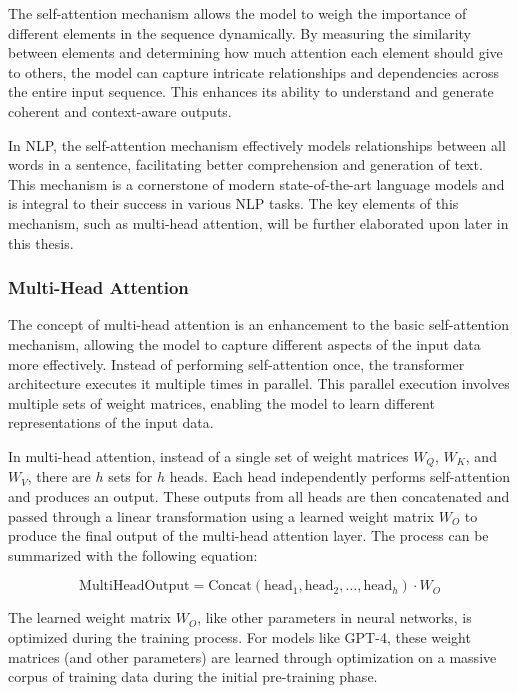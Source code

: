 The self-attention mechanism allows the model to weigh the importance of different elements in the sequence dynamically. By measuring the similarity between elements and determining how much attention each element should give to others, the model can capture intricate relationships and dependencies across the entire input sequence. This enhances its ability to understand and generate coherent and context-aware outputs. 

In NLP, the self-attention mechanism effectively models relationships between all words in a sentence, facilitating better comprehension and generation of text. This mechanism is a cornerstone of modern state-of-the-art language models and is integral to their success in various NLP tasks. The key elements of this mechanism, such as multi-head attention, will be further elaborated upon later in this thesis.

\subsubsection{Multi-Head Attention}

The concept of multi-head attention is an enhancement to the basic self-attention mechanism, allowing the model to capture different aspects of the input data more effectively. Instead of performing self-attention once, the transformer architecture executes it multiple times in parallel. This parallel execution involves multiple sets of weight matrices, enabling the model to learn different representations of the input data.

In multi-head attention, instead of a single set of weight matrices \( W_Q \), \( W_K \), and \( W_V \), there are \( h \) sets for \( h \) heads. Each head independently performs self-attention and produces an output. These outputs from all heads are then concatenated and passed through a linear transformation using a learned weight matrix \( W_O \) to produce the final output of the multi-head attention layer. The process can be summarized with the following equation:

\begin{equation}
    \text{MultiHeadOutput} = \text{Concat}(\text{head}_1, \text{head}_2, \ldots, \text{head}_h) \cdot W_O
\end{equation}

The learned weight matrix \( W_O \), like other parameters in neural networks, is optimized during the training process. For models like GPT-4, these weight matrices (and other parameters) are learned through optimization on a massive corpus of training data during the initial pre-training phase.

